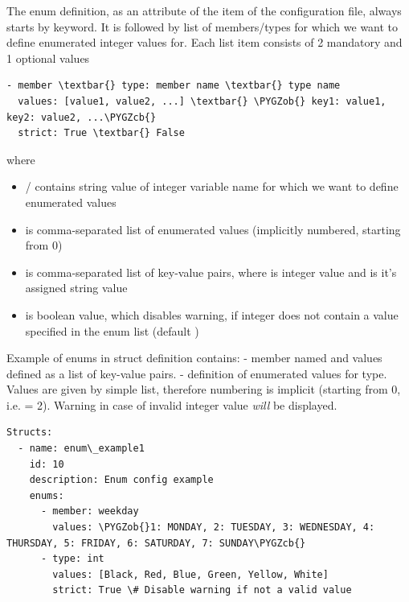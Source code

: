 \documentclass[A4paper,10pt,english]{sphinxmanual}
\def\PYGZob{\char`\{}
\def\PYGZcb{\char`\}}
\begin{document}
The enum definition, as an attribute of the  item of the configuration file, always starts by  keyword. It is followed by list of members/types for which we want to define enumerated integer values for. Each list item consists of 2 mandatory and 1 optional values

\begin{Verbatim}[commandchars=\\\{\}]
- member \textbar{} type: member name \textbar{} type name
  values: [value1, value2, ...] \textbar{} \PYGZob{} key1: value1, key2: value2, ...\PYGZcb{}
  strict: True \textbar{} False
\end{Verbatim}

where
\begin{itemize}
\item {} 
/ contains string value of integer variable name for which we want to define enumerated values

\item {} 
 is comma-separated list of enumerated values (implicitly numbered, starting from 0)

\item {} 
 is comma-separated list of key-value pairs, where  is integer value and  is it's assigned string value

\item {} 
 is boolean value, which disables warning, if integer does not contain a value specified in the enum list (default )

\end{itemize}

Example of enums in struct definition contains:
- member named  and values defined as a list of key-value pairs.
- definition of enumerated values for  type. Values are given by simple list, therefore numbering is implicit (starting from 0, i.e.  = 2). Warning in case of invalid integer value \emph{will} be displayed.

\begin{Verbatim}[commandchars=\\\{\}]
Structs:
  - name: enum\_example1
    id: 10
    description: Enum config example
    enums:
      - member: weekday
        values: \PYGZob{}1: MONDAY, 2: TUESDAY, 3: WEDNESDAY, 4: THURSDAY, 5: FRIDAY, 6: SATURDAY, 7: SUNDAY\PYGZcb{}
      - type: int
        values: [Black, Red, Blue, Green, Yellow, White]
        strict: True \# Disable warning if not a valid value
\end{Verbatim}
\end{document}
